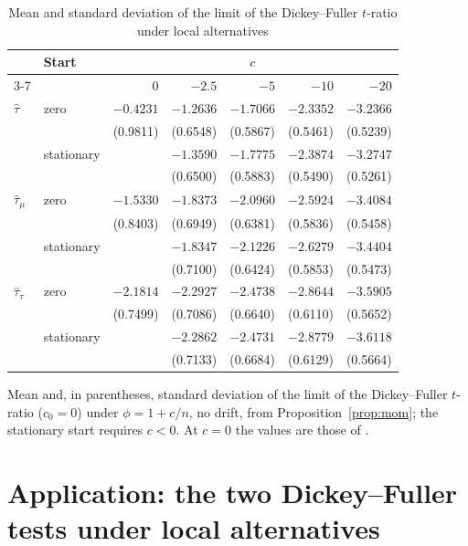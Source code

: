 \documentclass[ecta,nameyear,final]{econsocart}
\theoremstyle{plain}
\theoremstyle{definition}
\begin{document}
\begin{table}[tbp]
\caption{Mean and standard deviation of the limit of the Dickey--Fuller $t$-ratio under local alternatives}
\label{tab:mom}
\begin{center}
\small
\begin{tabular}{llrrrrr}
\toprule
 & Start & \multicolumn{5}{c}{$c$}\\
\cmidrule(lr){3-7}
 & & $0$ & $-2.5$ & $-5$ & $-10$ & $-20$\\
\midrule
$\hat\tau$ & zero & $-0.4231$ & $-1.2636$ & $-1.7066$ & $-2.3352$ & $-3.2366$\\
 & & (0.9811) & (0.6548) & (0.5867) & (0.5461) & (0.5239)\\
 & stationary &  & $-1.3590$ & $-1.7775$ & $-2.3874$ & $-3.2747$\\
 & &  & (0.6500) & (0.5883) & (0.5490) & (0.5261)\\[0.4ex]
$\hat\tau_\mu$ & zero & $-1.5330$ & $-1.8373$ & $-2.0960$ & $-2.5924$ & $-3.4084$\\
 & & (0.8403) & (0.6949) & (0.6381) & (0.5836) & (0.5458)\\
 & stationary &  & $-1.8347$ & $-2.1226$ & $-2.6279$ & $-3.4404$\\
 & &  & (0.7100) & (0.6424) & (0.5853) & (0.5473)\\[0.4ex]
$\hat\tau_\tau$ & zero & $-2.1814$ & $-2.2927$ & $-2.4738$ & $-2.8644$ & $-3.5905$\\
 & & (0.7499) & (0.7086) & (0.6640) & (0.6110) & (0.5652)\\
 & stationary &  & $-2.2862$ & $-2.4731$ & $-2.8779$ & $-3.6118$\\
 & &  & (0.7133) & (0.6684) & (0.6129) & (0.5664)\\
\bottomrule
\end{tabular}
\end{center}
{\small Mean and, in parentheses, standard deviation of the limit of the Dickey--Fuller $t$-ratio ($c_0=0$) under $\phi=1+c/n$, no drift, from Proposition~\ref{prop:mom}; the stationary start requires $c<0$.  At $c=0$ the values are those of \cite{Nabeya1999}.}
\end{table}

\section{Application: the two Dickey--Fuller tests under local alternatives}
\label{sec:app}
\end{document}
